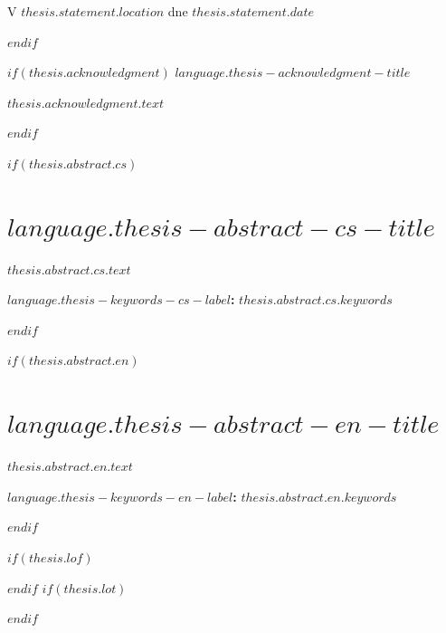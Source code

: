 \noindent V $thesis.statement.location$ dne $thesis.statement.date$

\vspace{2.5cm}

\noindent\makebox[15em]{\dotfill}

\clearpage
$endif$

$if(thesis.acknowledgment)$
\thispagestyle{empty}
\vspace*{\fill}
{\Large\bfseries $language.thesis-acknowledgment-title$}

\vspace{\chapterafterskip}

$thesis.acknowledgment.text$

\clearpage
$endif$

$if(thesis.abstract.cs)$
\thispagestyle{empty}
\chapter*{$language.thesis-abstract-cs-title$}


$thesis.abstract.cs.text$

\bigskip

\noindent\textbf{$language.thesis-keywords-cs-label$:} $thesis.abstract.cs.keywords$

\clearpage
$endif$

$if(thesis.abstract.en)$
\thispagestyle{empty}
\chapter*{$language.thesis-abstract-en-title$}


$thesis.abstract.en.text$

\bigskip

\noindent\textbf{$language.thesis-keywords-en-label$:} $thesis.abstract.en.keywords$

\clearpage
$endif$

\renewcommand{\contentsname}{$language.thesis-toc-title$}
\renewcommand{\listfigurename}{$language.thesis-lof-title$}
\renewcommand{\listtablename}{$language.thesis-lot-title$}
\setcounter{tocdepth}{$if(toc-depth)$$toc-depth$$else$3$endif$}
{\singlespacing
\tableofcontents
$if(thesis.lof)$\listoffigures$endif$
$if(thesis.lot)$\listoftables$endif$
}


